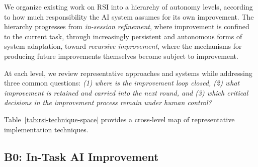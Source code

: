

We organize existing work on RSI into a hierarchy of autonomy levels, according to how much responsibility the AI system assumes for its own improvement. The hierarchy progresses from \emph{in-session refinement}, where improvement is confined to the current task, through increasingly persistent and autonomous forms of system adaptation, toward \emph{recursive improvement}, where the mechanisms for producing future improvements themselves become subject to improvement.

At each level, we review representative approaches and systems while addressing three common questions: \emph{(1) where is the improvement loop closed, (2) what improvement is retained and carried into the next round, and (3) which critical decisions in the improvement process remain under human control?} %

Table~\ref{tab:rsi-technique-space} provides a cross-level map of representative implementation techniques.

\subsection{B0: In-Task AI Improvement}
\label{sec:b0-output-iteration}


